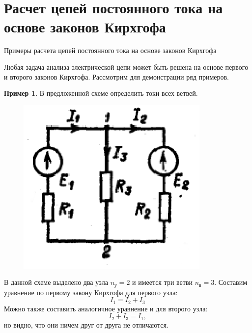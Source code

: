 \documentclass[10pt, pdf, hyperref={unicode},handout]{beamer}
\begin{document}
\section{Расчет цепей постоянного тока на основе законов Кирхгофа}
\begin{frame}{Примеры расчета цепей постоянного тока на основе законов Кирхгофа}
  \begin{block}

    \small{
      Любая задача анализа электрической цепи может быть решена на основе первого и второго законов Кирхгофа. Рассмотрим для демонстрации ряд примеров.

      \textbf{Пример 1.} В предложенной схеме определить токи всех ветвей.
      \begin{figure}[htb] 
    \centering
    \includegraphics [scale=1.3]{ris2.eps}
  \end{figure}

  В данной схеме выделено два узла $n_{\text{у}}=2$ и имеется три ветви $n_{\text{в}}=3$. Составим уравнение по первому закону Кирхгофа для первого узла: $$I_1=I_2+I_3$$
  Можно также составить аналогичное уравнение и для второго узла: $$I_2+I_3=I_1,$$ но видно, что они ничем друг от друга не отличаются.
}

  \end{block}
  
\end{frame}
\end{document}
